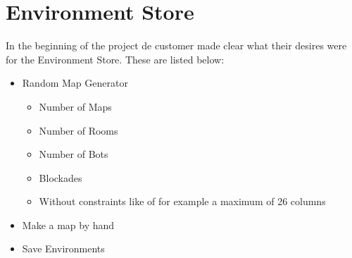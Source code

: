 \documentclass[]{article}
\begin{document}
\section{Environment Store}
In the beginning of the project de customer made clear what their desires were for the Environment Store. These are listed below:
\begin{itemize}
	\item Random Map Generator
	\begin{itemize}
		\item Number of Maps
		\item Number of Rooms
		\item Number of Bots
		\item Blockades
		\item Without constraints like of for example a maximum of 26 columns
	\end{itemize}
	\item Make a map by hand
	\item Save Environments
\end{itemize} 
\end{document}
